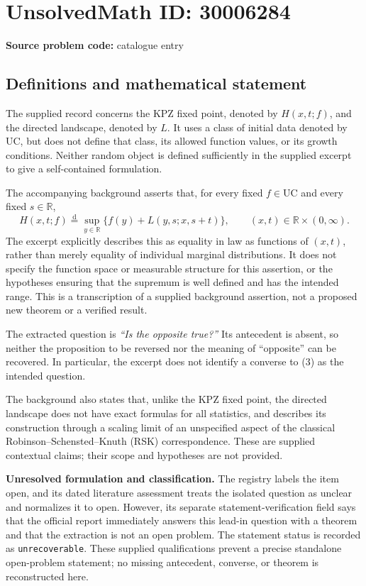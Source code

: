 \documentclass[11pt]{article}
\newcommand{\R}{\mathbb{R}}
\begin{document}
\section*{UnsolvedMath ID: 30006284}
\textbf{Source problem code:} catalogue entry
\subsection{Definitions and mathematical statement}
The supplied record concerns the KPZ fixed point, denoted by \(H(x,t;f)\), and the directed landscape, denoted by \(L\). It uses a class of initial data denoted by \(\mathrm{UC}\), but does not define that class, its allowed function values, or its growth conditions. Neither random object is defined sufficiently in the supplied excerpt to give a self-contained formulation.

The accompanying background asserts that, for every fixed \(f\in\mathrm{UC}\) and every fixed \(s\in\R\),
\[
H(x,t;f)\overset{\mathrm d}{=}
\sup_{y\in\R}\bigl\{f(y)+L(y,s;x,s+t)\bigr\},
\qquad (x,t)\in\R\times(0,\infty).
\tag{3}
\]
The excerpt explicitly describes this as equality in law as functions of \((x,t)\), rather than merely equality of individual marginal distributions. It does not specify the function space or measurable structure for this assertion, or the hypotheses ensuring that the supremum is well defined and has the intended range. This is a transcription of a supplied background assertion, not a proposed new theorem or a verified result.

The extracted question is \emph{``Is the opposite true?''} Its antecedent is absent, so neither the proposition to be reversed nor the meaning of ``opposite'' can be recovered. In particular, the excerpt does not identify a converse to (3) as the intended question.

The background also states that, unlike the KPZ fixed point, the directed landscape does not have exact formulas for all statistics, and describes its construction through a scaling limit of an unspecified aspect of the classical Robinson--Schensted--Knuth (RSK) correspondence. These are supplied contextual claims; their scope and hypotheses are not provided.

\textbf{Unresolved formulation and classification.} The registry labels the item open, and its dated literature assessment treats the isolated question as unclear and normalizes it to open. However, its separate statement-verification field says that the official report immediately answers this lead-in question with a theorem and that the extraction is not an open problem. The statement status is recorded as \texttt{unrecoverable}. These supplied qualifications prevent a precise standalone open-problem statement; no missing antecedent, converse, or theorem is reconstructed here.
\end{document}
